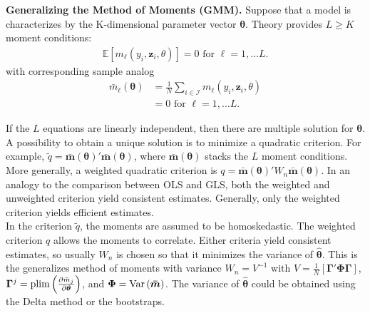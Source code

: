 \noindent \textbf{Generalizing the Method of Moments (GMM).} Suppose that a model is characterizes by the K-dimensional parameter vector $\bm{\theta}$. Theory provides $L \geq K$ moment conditions: 
\begin{align}
	\mathbb{E} \left[ m_\ell \left( y_i, \bm{z}_i, \theta \right) \right] = 0 \text{ for } \ell = 1, \ldots L. 
\end{align}
\noindent with corresponding sample analog
\begin{align}
	\bar{m}_\ell \left( \bm{\theta} \right) & = \frac{1}{N} \sum \limits _{i \in \mathcal{I}} m_\ell \left( y_i, \bm{z}_i, \theta \right) \nonumber \\ & = 0 \text{ for } \ell = 1, \ldots L. 
\end{align}

\noindent If the $L$ equations are linearly independent, then there are multiple solution for $\bm{\theta}$. A possibility to obtain a unique solution is to minimize a quadratic criterion. For example, $\tilde{q} = \bar{\bm{m}}  \left( \bm{\theta} \right)' \bar{\bm{m}}  \left( \bm{\theta} \right)$, where $\bar{\bm{m}}  \left( \bm{\theta} \right)$ stacks the $L$ moment conditions. More generally, a weighted quadratic criterion is $q = \bar{\bm{m}}  \left( \bm{\theta} \right)' W_n \bar{\bm{m}}  \left( \bm{\theta} \right)$. In an analogy to the comparison between OLS and GLS, both the weighted and unweighted criterion yield consistent estimates. Generally, only the weighted criterion yields efficient estimates.\\

\noindent In the criterion $\tilde{q}$, the moments are assumed to be homoskedastic. The weighted criterion $q$ allows the moments to correlate. Either criteria yield consistent estimates, so usually $W_n$ is chosen so that it minimizes the variance of $\bm{\hat{\theta}}$.  This is the generalizes method of moments with variance $W_n = V^{-1}$ with $V = \frac{1}{N} \left[ \bm{\Gamma}' \bm{\Phi} \bm{\Gamma} \right]$, $\bm{\Gamma}^j = \operatorname{plim} \left( \frac{ \partial \bar{m}_j} { \partial \bm{\theta} } \right)$, and $\bm{\Phi} = \operatorname{Var} \left( \bm{\bar{m}} \right)$. The variance of $\bm{\hat{\theta}}$ could be obtained using the Delta method or the bootstraps.
  

